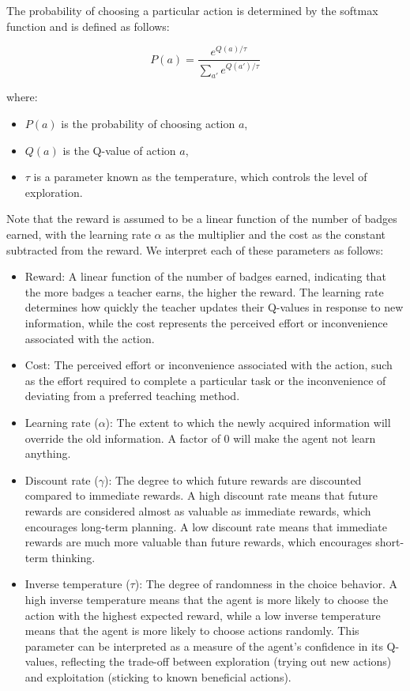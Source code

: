 \documentclass[
  number,
  preprint,
  3p,
  onecolumn]{elsarticle}
\providecommand{\tightlist}{%
  \setlength{\itemsep}{0pt}\setlength{\parskip}{0pt}}\usepackage{longtable,booktabs,array}
\begin{document}
The probability of choosing a particular action is determined by the
softmax function and is defined as follows:

\[
P(a) = \frac{e^{Q(a)/\tau}}{\sum_{a'} e^{Q(a')/\tau}}
\]

where:

\begin{itemize}
\tightlist
\item
  \(P(a)\) is the probability of choosing action \(a\),
\item
  \(Q(a)\) is the Q-value of action \(a\),
\item
  \(\tau\) is a parameter known as the temperature, which controls the
  level of exploration.
\end{itemize}

Note that the reward is assumed to be a linear function of the number of
badges earned, with the learning rate \(\alpha\) as the multiplier and
the cost as the constant subtracted from the reward. We interpret each
of these parameters as follows:

\begin{itemize}
\item
  Reward: A linear function of the number of badges earned, indicating
  that the more badges a teacher earns, the higher the reward. The
  learning rate determines how quickly the teacher updates their
  Q-values in response to new information, while the cost represents the
  perceived effort or inconvenience associated with the action.
\item
  Cost: The perceived effort or inconvenience associated with the
  action, such as the effort required to complete a particular task or
  the inconvenience of deviating from a preferred teaching method.
\item
  Learning rate (\(\alpha\)): The extent to which the newly acquired
  information will override the old information. A factor of 0 will make
  the agent not learn anything.
\item
  Discount rate (\(\gamma\)): The degree to which future rewards are
  discounted compared to immediate rewards. A high discount rate means
  that future rewards are considered almost as valuable as immediate
  rewards, which encourages long-term planning. A low discount rate
  means that immediate rewards are much more valuable than future
  rewards, which encourages short-term thinking.
\item
  Inverse temperature (\(\tau\)): The degree of randomness in the choice
  behavior. A high inverse temperature means that the agent is more
  likely to choose the action with the highest expected reward, while a
  low inverse temperature means that the agent is more likely to choose
  actions randomly. This parameter can be interpreted as a measure of
  the agent's confidence in its Q-values, reflecting the trade-off
  between exploration (trying out new actions) and exploitation
  (sticking to known beneficial actions).
\end{itemize}
\end{document}
